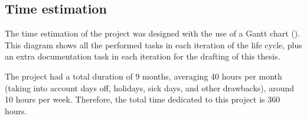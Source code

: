 

\subsection{Time estimation}
The time estimation of the project was designed with the use of a Gantt chart \parencite{clark1922gantt} (). This diagram shows all the performed tasks in each iteration of the life cycle, plus an extra documentation task in each iteration for the drafting of this thesis.

The project had a total duration of 9 months, averaging 40 hours per month (taking into account days off, holidays, sick days, and other drawbacks), around 10 hours per week. Therefore, the total time dedicated to this project is 360 hours.


